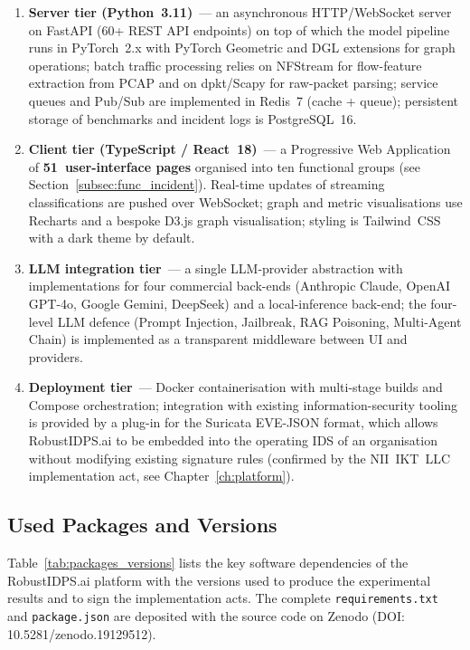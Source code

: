 \begin{enumerate}[leftmargin=2em, itemsep=0pt]
\item \textbf{Server tier (Python~3.11)}~--- an asynchronous
HTTP/WebSocket server on FastAPI (60+ REST API endpoints) on top
of which the model pipeline runs in PyTorch~2.x with PyTorch
Geometric and DGL extensions for graph operations; batch traffic
processing relies on NFStream for flow-feature extraction from
PCAP and on dpkt/Scapy for raw-packet parsing; service queues and
Pub/Sub are implemented in Redis~7 (cache + queue); persistent
storage of benchmarks and incident logs is PostgreSQL~16.

\item \textbf{Client tier (TypeScript / React~18)}~--- a
Progressive Web Application of \textbf{51~user-interface pages}
organised into ten functional groups (see
Section~\ref{subsec:func_incident}). Real-time updates of
streaming classifications are pushed over WebSocket; graph and
metric visualisations use Recharts and a bespoke D3.js graph
visualisation; styling is Tailwind~CSS with a dark theme by
default.

\item \textbf{LLM integration tier}~--- a single LLM-provider
abstraction with implementations for four commercial back-ends
(Anthropic Claude, OpenAI GPT-4o, Google Gemini, DeepSeek) and a
local-inference back-end; the four-level LLM defence (Prompt
Injection, Jailbreak, RAG Poisoning, Multi-Agent Chain) is
implemented as a transparent middleware between UI and providers.

\item \textbf{Deployment tier}~--- Docker containerisation with
multi-stage builds and Compose orchestration; integration with
existing information-security tooling is provided by a plug-in
for the Suricata EVE-JSON format, which allows RobustIDPS.ai to
be embedded into the operating IDS of an organisation without
modifying existing signature rules (confirmed by the NII~IKT~LLC
implementation act, see Chapter~\ref{ch:platform}).

\end{enumerate}

\subsection{Used Packages and Versions}
\label{subsec:packages_versions}

Table~\ref{tab:packages_versions} lists the key software
dependencies of the RobustIDPS.ai platform with the versions used
to produce the experimental results and to sign the implementation
acts. The complete \texttt{requirements.txt} and
\texttt{package.json} are deposited with the source code on Zenodo
(DOI: 10.5281/zenodo.19129512).

